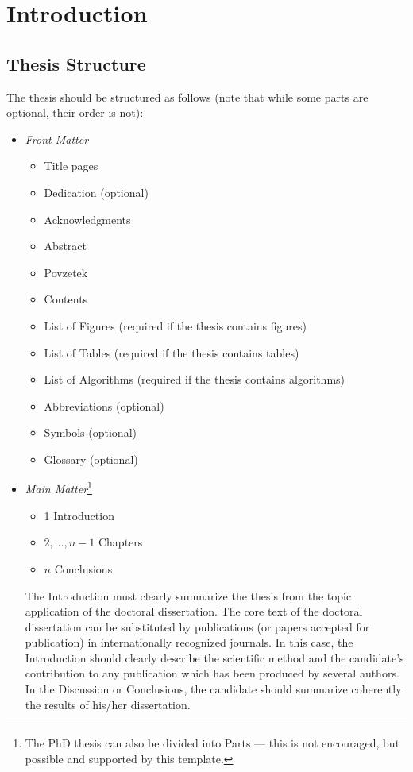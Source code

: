 % 
\chapter{Introduction}

\section{Thesis Structure}

The thesis should be structured as follows (note that while some parts are optional, their order is not):
\begin{itemize}
	\item \emph{Front Matter}
	\begin{itemize}
		\item Title pages
		\item Dedication (optional)
		\item Acknowledgments
		\item Abstract
		\item Povzetek
		\item Contents
		\item List of Figures (required if the thesis contains figures)
		\item List of Tables (required if the thesis contains tables)
		\item List of Algorithms (required if the thesis contains algorithms)
		\item Abbreviations (optional)
		\item Symbols (optional)
		\item Glossary (optional)
	\end{itemize}
	\item \emph{Main Matter}\footnote{The PhD thesis can also be divided into Parts --- this is not encouraged, but possible and supported by this template.}
	\begin{itemize}
		\item 1 Introduction
		\item $2, \dots, n-1$ Chapters
		\item $n$ Conclusions
	\end{itemize}
	The Introduction must clearly summarize the thesis from the topic application of the doctoral dissertation. The core text of the doctoral dissertation can be substituted by publications (or papers accepted for publication) in internationally recognized journals. In this case, the Introduction should clearly describe the scientific method and the candidate’s contribution to any publication which has been produced by several authors. In the Discussion or Conclusions, the candidate should summarize coherently the results of his/her dissertation.

\end{itemize}

